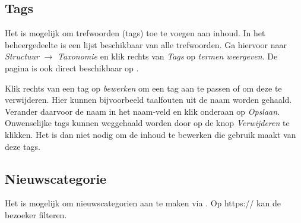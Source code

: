 \subsection{Tags}
Het is mogelijk om trefwoorden (tags) toe te voegen aan inhoud. In het beheergedeelte is een lijst beschikbaar van alle trefwoorden. Ga hiervoor naar \emph{Structuur} $\rightarrow$ \emph{Taxonomie} en klik rechts van \emph{Tags} op \emph{termen weergeven}. De pagina is ook direct beschikbaar op .

Klik rechts van een tag op \emph{bewerken} om een tag aan te passen of om deze te verwijderen. Hier kunnen bijvoorbeeld taalfouten uit de naam worden gehaald. Verander daarvoor de naam in het naam-veld en klik onderaan op \emph{Opslaan}. Onwenselijke tags kunnen weggehaald worden door op de knop \emph{Verwijderen} te klikken. Het is dan niet nodig om de inhoud te bewerken die gebruik maakt van deze tags.

\subsection{Nieuwscategorie}
Het is mogelijk om nieuwscategorien aan te maken via . Op  https:// kan de bezoeker filteren.
